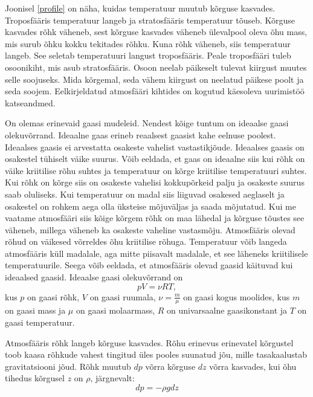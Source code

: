 \documentclass{trkut}%
\begin{document}
Joonisel \ref{profile} on näha, kuidas temperatuur muutub kõrguse kasvades. Troposfääris temperatuur langeb ja stratosfääris temperatuur tõuseb. Kõrguse kasvades rõhk väheneb, sest kõrguse kasvades väheneb ülevalpool oleva õhu mass, mis surub õhku kokku tekitades rõhku. Kuna rõhk väheneb, siis temperatuur langeb. See seletab temperatuuri langust troposfääris. Peale troposfääri tuleb osoonikiht, mis asub stratosfääris. Osoon neelab päikeselt tulevat kiirgust muutes selle soojuseks. Mida kõrgemal, seda vähem kiirgust on neelatud päikese poolt ja seda soojem. Eelkirjeldatud atmosfääri kihtides on kogutud käesoleva uurimistöö katseandmed.

On olemas erinevaid gaasi mudeleid. Nendest kõige tuntum on ideaalse gaasi olekuvõrrand. Ideaalne gaas erineb reaalsest gaasist kahe eelnuse poolest. Ideaalses gaasis ei arvestatta osakeste vahelist vastastikjõude. Ideaalses gaasis on osakestel tühiselt väike suurus. Võib eeldada, et gaas on ideaalne siis kui rõhk on väike kriitilise rõhu suhtes ja temperatuur on kõrge kriitilise temperatuuri suhtes. Kui rõhk on kõrge siis on osakeste vahelisi kokkupõrkeid palju ja osakeste suurus saab oluliseks. Kui temperatuur on madal siis liiguvad osakesed aeglaselt ja osakestel on rohkem aega olla üksteise mõjuväljas ja saada mõjutatud. Kui me vaatame atmosfääri siis kõige kõrgem rõhk on maa lähedal ja kõrguse tõustes see väheneb, millega väheneb ka osakeste vaheline vastasmõju. Atmosfääris olevad rõhud on väikesed võrreldes õhu kriitilise rõhuga. Temperatuur võib langeda atmosfääris küll madalale, aga mitte piisavalt madalale, et see läheneks kriitilisele temperatuurile. Seega võib eeldada, et atmosfääris olevad gaasid käituvad kui ideaalsed gaasid. Ideaalse gaasi olekuvõrrand on
\begin{equation}\label{eq8}
pV=\nu RT ,
\end{equation}
kus $p$ on gaasi rõhk, $V$ on gaasi ruumala, $\nu = \frac{m}{\mu}$ on gaasi kogus moolides, kus $m$ on gaasi mass ja $\mu$ on gaasi molaarmass, $R$ on univarsaalne gaasikonstant ja $T$ on gaasi temperatuur.

Atmosfääris rõhk langeb kõrguse kasvades. Rõhu erinevus erinevatel kõrgustel toob kaasa rõhkude vahest tingitud üles pooles suunatud jõu, mille tasakaalustab gravitatsiooni jõud. Rõhk muutub $dp$ võrra kõrguse $dz$ võrra kasvades, kui õhu tihedus kõrgusel $z$ on $\rho$, järgnevalt:
\begin{equation}\label{eq10}
dp=-\rho gdz
\end{equation}
\end{document}
